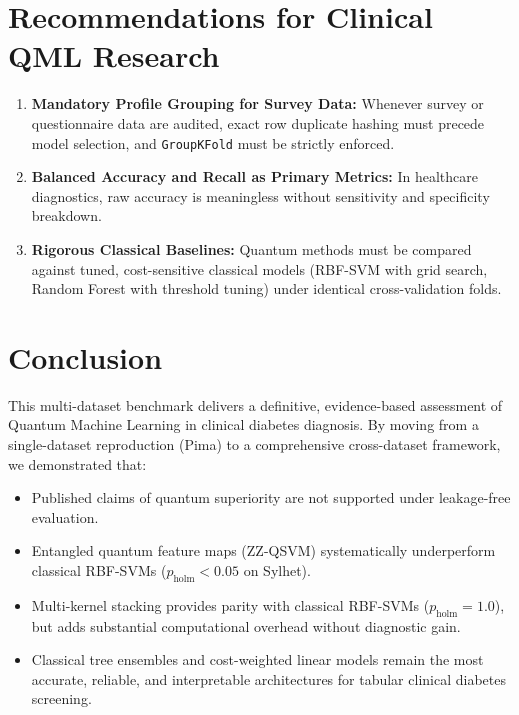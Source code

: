 \documentclass[11pt,a4paper]{article}
\begin{document}
\section{Recommendations for Clinical QML Research}
\begin{enumerate}[leftmargin=1.5em]
    \item \textbf{Mandatory Profile Grouping for Survey Data:} Whenever survey or questionnaire data are audited, exact row duplicate hashing must precede model selection, and \texttt{GroupKFold} must be strictly enforced.
    \item \textbf{Balanced Accuracy and Recall as Primary Metrics:} In healthcare diagnostics, raw accuracy is meaningless without sensitivity and specificity breakdown.
    \item \textbf{Rigorous Classical Baselines:} Quantum methods must be compared against tuned, cost-sensitive classical models (RBF-SVM with grid search, Random Forest with threshold tuning) under identical cross-validation folds.
\end{enumerate}

\section{Conclusion}
This multi-dataset benchmark delivers a definitive, evidence-based assessment of Quantum Machine Learning in clinical diabetes diagnosis. By moving from a single-dataset reproduction (Pima) to a comprehensive cross-dataset framework, we demonstrated that:
\begin{itemize}[leftmargin=1.5em]
    \item Published claims of quantum superiority are not supported under leakage-free evaluation.
    \item Entangled quantum feature maps (ZZ-QSVM) systematically underperform classical RBF-SVMs ($p_{\text{holm}} < 0.05$ on Sylhet).
    \item Multi-kernel stacking provides parity with classical RBF-SVMs ($p_{\text{holm}} = 1.0$), but adds substantial computational overhead without diagnostic gain.
    \item Classical tree ensembles and cost-weighted linear models remain the most accurate, reliable, and interpretable architectures for tabular clinical diabetes screening.
\end{itemize}
\end{document}
